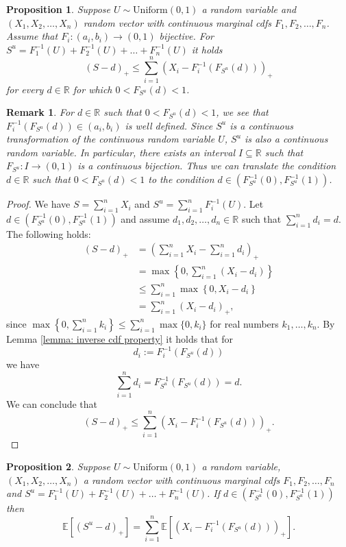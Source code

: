 \documentclass{article}
\newtheorem{proposition}{Proposition}
\newtheorem{remark}{Remark}
\begin{document}
\begin{proposition}\cite[Proposition 1]{kaas-2000}\label{property upper bound (S-d)_+}
    Suppose $U\sim \text{Uniform}(0,1)$ a random variable and $(X_1,X_2,\dots,X_n)$      random vector with continuous marginal cdfs $F_1,F_2,\dots,F_n$. Assume that $F_i:(a_i,b_i) \rightarrow (0,1)$ bijective. For $S^u =  F_1^{-1}(U) + F_2^{-1}(U) + \dots + F_n^{-1}(U)$ it holds
    \begin{equation}\label{eq: upper bound (S-d)_+}
        (S-d)_+ \leq \sum_{i=1}^n\left(X_i - F_i^{-1}(F_{S^u}(d))\right)_+
    \end{equation}
    for every $d \in \mathbb{R}$ for which $0 < F_{S^u}(d) < 1$.
\end{proposition}
\begin{remark}
    For $d\in \mathbb{R}$ such that $0 < F_{S^u}(d) < 1$, we see that $F_i^{-1}(F_{S^u}(d))\in (a_i, b_i)$ is well defined. Since $S^u$ is a continuous transformation of the continuous random variable $U$, $S^u$ is also a continuous random variable. In particular, there exists an interval $I\subseteq \mathbb{R}$ such that $F_{S^u}: I \rightarrow (0,1)$ is a continuous bijection. Thus we can translate the condition $d\in \mathbb{R}$ such that $0 < F_{S^u}(d) < 1$ to the condition $d\in (F_{S^u}^{-1}(0), F_{S^u}^{-1}(1))$.
\end{remark}
\begin{proof}
    We have $S = \sum_{i=1}^nX_i$ and $S^u = \sum_{i=1}^nF^{-1}_i(U)$. Let  $d\in (F_{S^u}^{-1}(0), F_{S^u}^{-1}(1))$ and assume $d_1,d_2,\dots, d_n\in \mathbb{R}$ such that $\sum_{i=1}^nd_i = d$. The following holds:
    \begin{align*}
        (S-d)_+ &= \left(\sum_{i=1}^nX_i - \sum_{i=1}^nd_i\right)_+\\
        &= \max\left\{0,\sum_{i=1}^n(X_i  - d_i)\right\}\\
        &\leq \sum_{i=1}^n \max\left\{0,X_i  - d_i\right\}\\
        &= \sum_{i=1}^n \left(X_i  - d_i\right)_+,
    \end{align*}
    since $\max\left\{0,\sum_{i=1}^nk_i\right\}\leq \sum_{i=1}^n\max\{0,k_i\}$ for real numbers $k_1,\dots,k_n$. By Lemma \ref{lemma: inverse cdf property} it holds that for $$d_i := F_i^{-1}(F_{S^u}(d))$$ we have $$\sum_{i=1}^nd_i = F_{S^u}^{-1}(F_{S^u}(d)) = d.$$ We can conclude that 
    $$(S-d)_+ \leq \sum_{i=1}^n\left(X_i - F_i^{-1}(F_{S^u}(d))\right)_+.$$
\end{proof}
\begin{proposition}\cite[Corollary 1]{kaas-2000}\label{property stop-loss premium}
    Suppose $U\sim \text{Uniform}(0,1)$ a random variable, $(X_1,X_2,\dots,X_n)$ a random vector with continuous marginal cdfs $F_1,F_2,\dots,F_n$ and $S^u = F_1^{-1}(U) + F_2^{-1}(U) + \dots + F_n^{-1}(U)$. If  $d\in (F_{S^u}^{-1}(0), F_{S^u}^{-1}(1))$ then
    $$\mathbb{E}[(S^u - d)_+] = \sum_{i=1}^n\mathbb{E}[(X_i - F^{-1}_i(F_{S^u}(d )))_+]. $$
\end{proposition}
\end{document}
